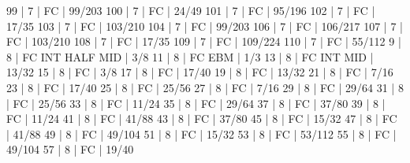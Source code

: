 99    |  7     |    FC                                        | 99/203   
100   |  7     |    FC                                        | 24/49   
101   |  7     |    FC                                        | 95/196   
102   |  7     |    FC                                        | 17/35   
103   |  7     |    FC                                        | 103/210   
104   |  7     |    FC                                        | 99/203   
106   |  7     |    FC                                        | 106/217   
107   |  7     |    FC                                        | 103/210   
108   |  7     |    FC                                        | 17/35   
109   |  7     |    FC                                        | 109/224   
110   |  7     |    FC                                        | 55/112   
9     |  8     |    FC  INT  HALF            MID              | 3/8   
11    |  8     |    FC             EBM                        | 1/3   
13    |  8     |    FC  INT                  MID              | 13/32   
15    |  8     |    FC                                        | 3/8   
17    |  8     |    FC                                        | 17/40   
19    |  8     |    FC                                        | 13/32   
21    |  8     |    FC                                        | 7/16   
23    |  8     |    FC                                        | 17/40   
25    |  8     |    FC                                        | 25/56   
27    |  8     |    FC                                        | 7/16   
29    |  8     |    FC                                        | 29/64   
31    |  8     |    FC                                        | 25/56   
33    |  8     |    FC                                        | 11/24   
35    |  8     |    FC                                        | 29/64   
37    |  8     |    FC                                        | 37/80   
39    |  8     |    FC                                        | 11/24   
41    |  8     |    FC                                        | 41/88   
43    |  8     |    FC                                        | 37/80   
45    |  8     |    FC                                        | 15/32   
47    |  8     |    FC                                        | 41/88   
49    |  8     |    FC                                        | 49/104   
51    |  8     |    FC                                        | 15/32   
53    |  8     |    FC                                        | 53/112   
55    |  8     |    FC                                        | 49/104   
57    |  8     |    FC                                        | 19/40   
